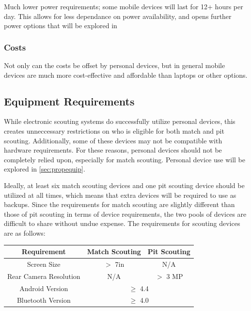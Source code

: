 \documentclass[11pt]{report}
\begin{document}
Much lower power requirements; some mobile devices will last for 12+ hours per day. This allows for less dependance on power availability, and opens further power options that will be explored in \

\subsubsection*{Costs}

Not only can the costs be offset by personal devices, but in general mobile devices are much more cost-effective and affordable than laptops or other options.


\subsection{Equipment Requirements}

While electronic scouting systems do successfully utilize personal devices, this creates unneccessary restrictions on who is eligible for both match and pit scouting. Additionally, some of these devices may not be compatible with hardware requirements. For these reasons, personal devices should not be completely relied upon, especially for match scouting. Personal device use will be explored in \autoref{sec:propequip}. \newline

Ideally, at least six match scouting devices and one pit scouting device should be utilized at all times, which means that extra devices will be required to use as backups. Since the requirements for match scouting are slightly different than those of pit scouting in terms of device requirements, the two pools of devices are difficult to share without undue expense. The requirements for scouting devices are as follows: 

\begin{center}
 \begin{tabular}{||c|c|c||} 
 \hline
 Requirement & Match Scouting & Pit Scouting \\  [0.5ex] 
 \hline \hline
 Screen Size & $>$ 7in & N/A \\ 
 \hline
 Rear Camera Resolution & N/A & $>$ 3 MP \\ 
 \hline
 Android Version & \multicolumn{2}{|c||}{$\geq$ 4.4}  \\
 \hline
 Bluetooth Version & \multicolumn{2}{|c||}{$\geq$ 4.0} \\  [1ex] 
 \hline
\end{tabular}
\end{center}
\end{document}
